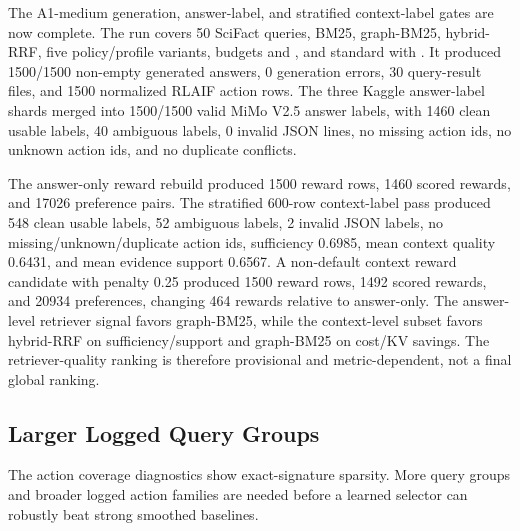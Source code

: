 The A1-medium generation, answer-label, and stratified context-label gates are now complete. The run covers 50 SciFact queries, BM25, graph-BM25, hybrid-RRF, five policy/profile variants, budgets  and , and standard  with . It produced 1500/1500 non-empty generated answers, 0 generation errors, 30 query-result files, and 1500 normalized RLAIF action rows. The three Kaggle answer-label shards merged into 1500/1500 valid MiMo V2.5 answer labels, with 1460 clean usable labels, 40 ambiguous labels, 0 invalid JSON lines, no missing action ids, no unknown action ids, and no duplicate conflicts.

The answer-only reward rebuild produced 1500 reward rows, 1460 scored rewards, and 17026 preference pairs. The stratified 600-row context-label pass produced 548 clean usable labels, 52 ambiguous labels, 2 invalid JSON labels, no missing/unknown/duplicate action ids, sufficiency 0.6985, mean context quality 0.6431, and mean evidence support 0.6567. A non-default context reward candidate with penalty 0.25 produced 1500 reward rows, 1492 scored rewards, and 20934 preferences, changing 464 rewards relative to answer-only. The answer-level retriever signal favors graph-BM25, while the context-level subset favors hybrid-RRF on sufficiency/support and graph-BM25 on cost/KV savings. The retriever-quality ranking is therefore provisional and metric-dependent, not a final global ranking.

\subsection{Larger Logged Query Groups}

The action coverage diagnostics show exact-signature sparsity. More query groups and broader logged action families are needed before a learned selector can robustly beat strong smoothed baselines.
